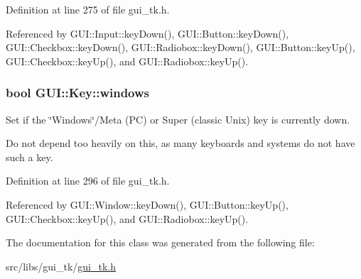 Definition at line 275 of file gui\-\_\-tk.\-h.



Referenced by G\-U\-I\-::\-Input\-::key\-Down(), G\-U\-I\-::\-Button\-::key\-Down(), G\-U\-I\-::\-Checkbox\-::key\-Down(), G\-U\-I\-::\-Radiobox\-::key\-Down(), G\-U\-I\-::\-Button\-::key\-Up(), G\-U\-I\-::\-Checkbox\-::key\-Up(), and G\-U\-I\-::\-Radiobox\-::key\-Up().

\hypertarget{classGUI_1_1Key_abc017c8f165f2b4c857c757ef413da3c}{
\subsubsection[{windows}]{\setlength{\rightskip}{0pt plus 5cm}bool {\bf G\-U\-I\-::\-Key\-::windows}}}\label{classGUI_1_1Key_abc017c8f165f2b4c857c757ef413da3c}


Set if the \char`\"{}\-Windows\char`\"{}/\-Meta (P\-C) or Super (classic Unix) key is currently down. 

Do not depend too heavily on this, as many keyboards and systems do not have such a key. 

Definition at line 296 of file gui\-\_\-tk.\-h.



Referenced by G\-U\-I\-::\-Window\-::key\-Down(), G\-U\-I\-::\-Button\-::key\-Up(), G\-U\-I\-::\-Checkbox\-::key\-Up(), and G\-U\-I\-::\-Radiobox\-::key\-Up().



The documentation for this class was generated from the following file\-:\begin{DoxyCompactItemize}
\item 
src/libs/gui\-\_\-tk/\hyperlink{gui__tk_8h}{gui\-\_\-tk.\-h}\end{DoxyCompactItemize}
